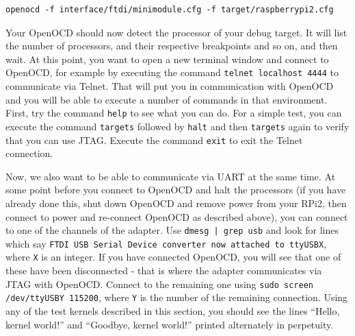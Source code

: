 \documentclass[a4paper,11pt,reqno]{amsart}
\begin{document}
\begin{verbatim}
openocd -f interface/ftdi/minimodule.cfg -f target/raspberrypi2.cfg
\end{verbatim}

Your OpenOCD should now detect the processor of your debug target. It will list the number of processors, and their respective breakpoints and so on, and then wait. At this point, you want to open a new terminal window and connect to OpenOCD, for example by executing the command \texttt{telnet localhost 4444} to communicate via Telnet. That will put you in communication with OpenOCD and you will be able to execute a number of commands in that environment. First, try the command \texttt{help} to see what you can do. For a simple test, you can execute the command \texttt{targets} followed by \texttt{halt} and then \texttt{targets} again to verify that you can use JTAG. Execute the command \texttt{exit} to exit the Telnet connection.

Now, we also want to be able to communicate via UART at the same time. At some point before you connect to OpenOCD and halt the processors (if you have already done this, shut down OpenOCD and remove power from your RPi2, then connect to power and re-connect OpenOCD as described above), you can connect to one of the channels of the adapter. Use \texttt{dmesg | grep usb} and look for lines which say \texttt{FTDI USB Serial Device converter now attached to ttyUSBX}, where \texttt{X} is an integer. If you have connected OpenOCD, you will see that one of these have been disconnected - that is where the adapter communicates via JTAG with OpenOCD. Connect to the remaining one using \texttt{sudo screen /dev/ttyUSBY 115200}, where \texttt{Y} is the number of the remaining connection. Using any of the test kernels described in this section, you should see the lines ``Hello, kernel world!'' and ``Goodbye, kernel world!'' printed alternately in perpetuity.
\end{document}
